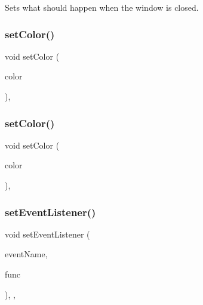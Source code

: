 Sets what should happen when the window is closed. 

\mbox{\label{classGForwardDrawingSurface_af6e1bcf23a09a0ae0607daff81ee45fa}} 
\subsubsection{\texorpdfstring{set\+Color()}{setColor()}\hspace{0.1cm}{\footnotesize\ttfamily [1/2]}}
{\footnotesize\ttfamily void set\+Color (\begin{DoxyParamCaption}\item[{int}]{color }\end{DoxyParamCaption})\hspace{0.3cm}{\ttfamily [override]}, {\ttfamily [inherited]}}

\mbox{\label{classGForwardDrawingSurface_a56845b1accc47aa881d05939eef6996c}} 
\subsubsection{\texorpdfstring{set\+Color()}{setColor()}\hspace{0.1cm}{\footnotesize\ttfamily [2/2]}}
{\footnotesize\ttfamily void set\+Color (\begin{DoxyParamCaption}\item[{const std\+::string \&}]{color }\end{DoxyParamCaption})\hspace{0.3cm}{\ttfamily [override]}, {\ttfamily [inherited]}}

\mbox{\label{classGObservable_ad2f6d34961c50f6c1e0659990b79f741}} 
\subsubsection{\texorpdfstring{set\+Event\+Listener()}{setEventListener()}\hspace{0.1cm}{\footnotesize\ttfamily [1/2]}}
{\footnotesize\ttfamily void set\+Event\+Listener (\begin{DoxyParamCaption}\item[{const std\+::string \&}]{event\+Name,  }\item[{G\+Event\+Listener}]{func }\end{DoxyParamCaption})\hspace{0.3cm}{\ttfamily [protected]}, {\ttfamily [virtual]}, {\ttfamily [inherited]}}



